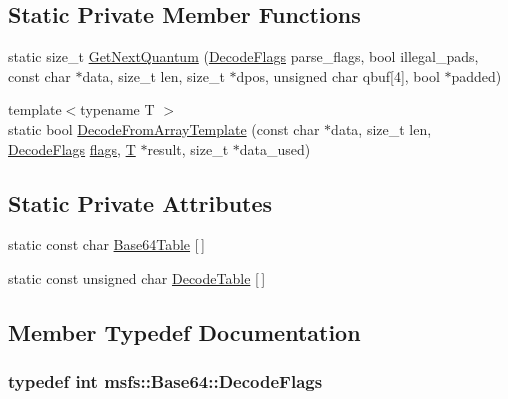 \subsection*{Static Private Member Functions}
\begin{DoxyCompactItemize}
\item 
static size\+\_\+t \hyperlink{classmsfs_1_1_base64_a77d2ed52665562005fb1fc0f9e22f987}{Get\+Next\+Quantum} (\hyperlink{classmsfs_1_1_base64_ab044f6b279e3a3c6004dd58ea625b3c7}{Decode\+Flags} parse\+\_\+flags, bool illegal\+\_\+pads, const char $\ast$data, size\+\_\+t len, size\+\_\+t $\ast$dpos, unsigned char qbuf\mbox{[}4\mbox{]}, bool $\ast$padded)
\item 
{\footnotesize template$<$typename T $>$ }\\static bool \hyperlink{classmsfs_1_1_base64_aa65a209f68859ba6c8c20a9c5bf86d5d}{Decode\+From\+Array\+Template} (const char $\ast$data, size\+\_\+t len, \hyperlink{classmsfs_1_1_base64_ab044f6b279e3a3c6004dd58ea625b3c7}{Decode\+Flags} \hyperlink{_http_parser_8h_ab6b306ef981f5e21bb41ea2c2dbe8cd9}{flags}, \hyperlink{http__parser_8c_ad24d0de3f597ca60dd95c4bc59c2ff73}{T} $\ast$result, size\+\_\+t $\ast$data\+\_\+used)
\end{DoxyCompactItemize}
\subsection*{Static Private Attributes}
\begin{DoxyCompactItemize}
\item 
static const char \hyperlink{classmsfs_1_1_base64_aba928b8815dd511ff05ed253e6dc8657}{Base64\+Table} \mbox{[}$\,$\mbox{]}
\item 
static const unsigned char \hyperlink{classmsfs_1_1_base64_a5ec48f5b0659f1ae23d52eb97f61f744}{Decode\+Table} \mbox{[}$\,$\mbox{]}
\end{DoxyCompactItemize}


\subsection{Member Typedef Documentation}
\hypertarget{classmsfs_1_1_base64_ab044f6b279e3a3c6004dd58ea625b3c7}{}
\subsubsection[{Decode\+Flags}]{\setlength{\rightskip}{0pt plus 5cm}typedef int {\bf msfs\+::\+Base64\+::\+Decode\+Flags}}\label{classmsfs_1_1_base64_ab044f6b279e3a3c6004dd58ea625b3c7}


